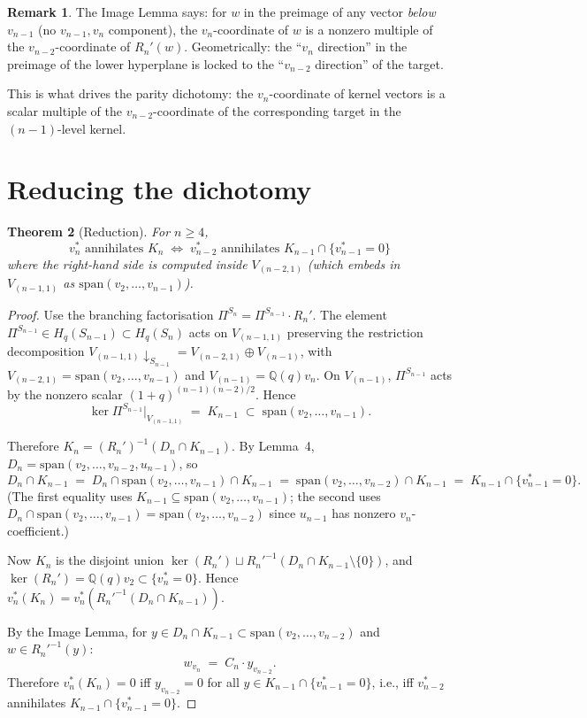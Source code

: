 \documentclass[11pt]{article}
\newtheorem{theorem}{Theorem}
\theoremstyle{definition}
\newtheorem{remark}[theorem]{Remark}
\begin{document}
\begin{remark}\label{rem:image-content}
The Image Lemma says: for $w$ in the preimage of any vector
\emph{below} $v_{n-1}$ (no $v_{n-1}, v_n$ component), the
$v_n$-coordinate of $w$ is a nonzero multiple of the
$v_{n-2}$-coordinate of $R_n'(w)$. Geometrically: the
``$v_n$ direction'' in the preimage of the lower hyperplane is
locked to the ``$v_{n-2}$ direction'' of the target.

This is what drives the parity dichotomy: the $v_n$-coordinate of
kernel vectors is a scalar multiple of the
$v_{n-2}$-coordinate of the corresponding target in the
$(n-1)$-level kernel.
\end{remark}

\section{Reducing the dichotomy}\label{sec:reduction}

\begin{theorem}[Reduction]\label{thm:reduction}
For $n \ge 4$,
\[
  v_n^* \text{ annihilates } K_n
  \;\iff\;
  v_{n-2}^* \text{ annihilates } K_{n-1} \cap \{v_{n-1}^*=0\}
\]
where the right-hand side is computed inside $V_{(n-2,1)}$ (which
embeds in $V_{(n-1,1)}$ as $\mathrm{span}(v_2,\ldots,v_{n-1})$).
\end{theorem}

\begin{proof}
Use the branching factorisation $\Pi^{S_n} = \Pi^{S_{n-1}} \cdot R_n'$.
The element $\Pi^{S_{n-1}} \in H_q(S_{n-1}) \subset H_q(S_n)$ acts on
$V_{(n-1,1)}$ preserving the restriction decomposition
$V_{(n-1,1)}\!\downarrow_{S_{n-1}} = V_{(n-2,1)} \oplus V_{(n-1)}$,
with $V_{(n-2,1)} = \mathrm{span}(v_2,\ldots,v_{n-1})$ and
$V_{(n-1)} = \mathbb{Q}(q) v_n$. On $V_{(n-1)}$,
$\Pi^{S_{n-1}}$ acts by the nonzero scalar $(1+q)^{(n-1)(n-2)/2}$.
Hence
\[
   \ker\Pi^{S_{n-1}}|_{V_{(n-1,1)}} \;=\; K_{n-1} \;\subset\; \mathrm{span}(v_2,\ldots,v_{n-1}).
\]

Therefore $K_n = (R_n')^{-1}(D_n \cap K_{n-1})$. By Lemma~4,
$D_n = \mathrm{span}(v_2,\ldots,v_{n-2}, u_{n-1})$, so
\[
   D_n \cap K_{n-1} \;=\; D_n \cap \mathrm{span}(v_2,\ldots,v_{n-1})\cap K_{n-1}
        \;=\; \mathrm{span}(v_2,\ldots,v_{n-2}) \cap K_{n-1}
        \;=\; K_{n-1} \cap \{v_{n-1}^*=0\}.
\]
(The first equality uses $K_{n-1} \subseteq \mathrm{span}(v_2,\ldots,v_{n-1})$;
the second uses $D_n \cap \mathrm{span}(v_2,\ldots,v_{n-1}) =
\mathrm{span}(v_2,\ldots,v_{n-2})$ since $u_{n-1}$ has nonzero
$v_n$-coefficient.)

Now $K_n$ is the disjoint union $\ker(R_n') \sqcup R_n'^{-1}(D_n \cap K_{n-1}\setminus\{0\})$,
and $\ker(R_n') = \mathbb{Q}(q) v_2 \subset \{v_n^*=0\}$. Hence
$v_n^*(K_n) = v_n^*(R_n'^{-1}(D_n \cap K_{n-1}))$.

By the Image Lemma, for $y \in D_n \cap K_{n-1} \subset \mathrm{span}(v_2,\ldots,v_{n-2})$
and $w \in R_n'^{-1}(y)$:
\[
   w_{v_n} \;=\; C_n \cdot y_{v_{n-2}}.
\]
Therefore $v_n^*(K_n) = 0$ iff $y_{v_{n-2}} = 0$ for all
$y \in K_{n-1} \cap \{v_{n-1}^*=0\}$, i.e., iff
$v_{n-2}^*$ annihilates $K_{n-1} \cap \{v_{n-1}^*=0\}$.
\end{proof}
\end{document}
